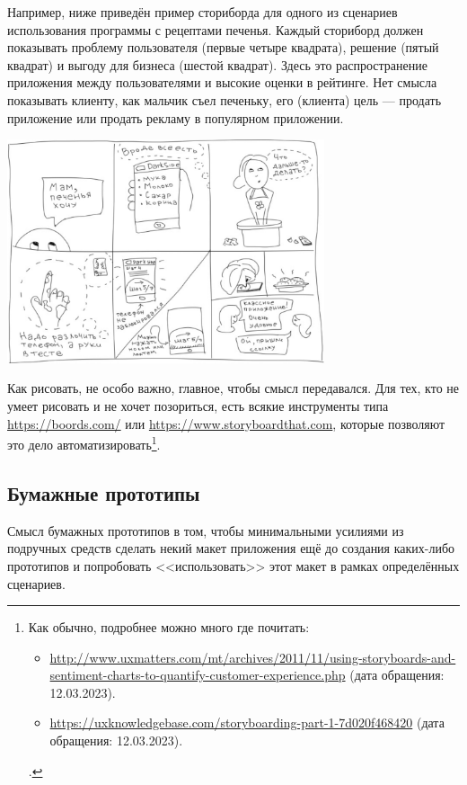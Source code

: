 \documentclass{../../text-style}
\begin{document}
Например, ниже приведён пример сториборда для одного из сценариев использования программы с рецептами печенья. Каждый сториборд должен показывать проблему пользователя (первые четыре квадрата), решение (пятый квадрат) и выгоду для бизнеса (шестой квадрат). Здесь это распространение приложения между пользователями и высокие оценки в рейтинге. Нет смысла показывать клиенту, как мальчик съел печеньку, его (клиента) цель --- продать приложение или продать рекламу в популярном приложении.

\begin{center}
    \includegraphics[width=0.7\textwidth]{storyboardingExample.png}
\end{center}

Как рисовать, не особо важно, главное, чтобы смысл передавался. Для тех, кто не умеет рисовать и не хочет позориться, есть всякие инструменты типа \url{https://boords.com/} или \url{https://www.storyboardthat.com}, которые позволяют это дело автоматизировать\footnote{Как обычно, подробнее можно много где почитать: 
\begin{itemize}
    \item \url{http://www.uxmatters.com/mt/archives/2011/11/using-storyboards-and-sentiment-charts-to-quantify-customer-experience.php} (дата обращения: 12.03.2023).
    \item \url{https://uxknowledgebase.com/storyboarding-part-1-7d020f468420} (дата обращения: 12.03.2023).
\end{itemize}.}.

\subsection{Бумажные прототипы}

Смысл бумажных прототипов в том, чтобы минимальными усилиями из подручных средств сделать некий макет приложения ещё до создания каких-либо прототипов и попробовать <<использовать>> этот макет в рамках определённых сценариев.
\end{document}
